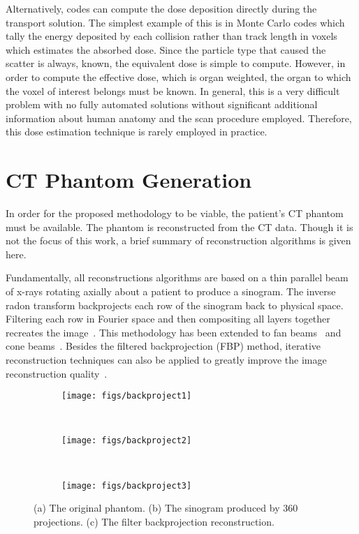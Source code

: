 Alternatively, codes can compute the dose deposition directly during the transport solution. The simplest example of this is in Monte Carlo codes which tally the energy deposited by each collision rather than track length in voxels which estimates the absorbed dose. Since the particle type that caused the scatter is always, known, the equivalent dose is simple to compute. However, in order to compute the effective dose, which is organ weighted, the organ to which the voxel of interest belongs must be known. In general, this is a very difficult problem with no fully automated solutions without significant additional information about human anatomy and the scan procedure employed. Therefore, this dose estimation technique is rarely employed in practice.

\section{CT Phantom Generation}

In order for the proposed methodology to be viable, the patient's CT phantom must be available. The phantom is reconstructed from the CT data. Though it is not the focus of this work, a brief summary of reconstruction algorithms is given here.

Fundamentally, all reconstructions algorithms are based on a thin parallel beam of x-rays rotating axially about a patient to produce a sinogram. The inverse radon transform backprojects each row of the sinogram back to physical space. Filtering each row in Fourier space and then compositing all layers together recreates the image~\citep{ref:mersereaur}. This methodology has been extended to fan beams~\citep{ref:bessong} and cone beams~\citep{ref:turbellh}. Besides the filtered backprojection (FBP) method, iterative reconstruction techniques can also be applied to greatly improve the image reconstruction quality~\citep{ref:pontanaf}.

\begin{figure}
    \centering
    \begin{subfigure}[b]{0.38\textwidth}
        \texttt{[image: figs/backproject1]}
        \caption{}
        \label{fig:beamconexy}
    \end{subfigure}
    ~
    \begin{subfigure}[b]{0.19\textwidth}
        \texttt{[image: figs/backproject2]}
        \caption{}
        \label{fig:beamfanxy}
    \end{subfigure}
    ~
    \begin{subfigure}[b]{0.38\textwidth}
        \texttt{[image: figs/backproject3]}
        \caption{}
        \label{fig:subsweep_general3}
    \end{subfigure}
    \caption{(a) The original phantom. (b) The sinogram produced by 360 projections. (c) The filter backprojection reconstruction.}\label{fig:backprojection}
\end{figure}

